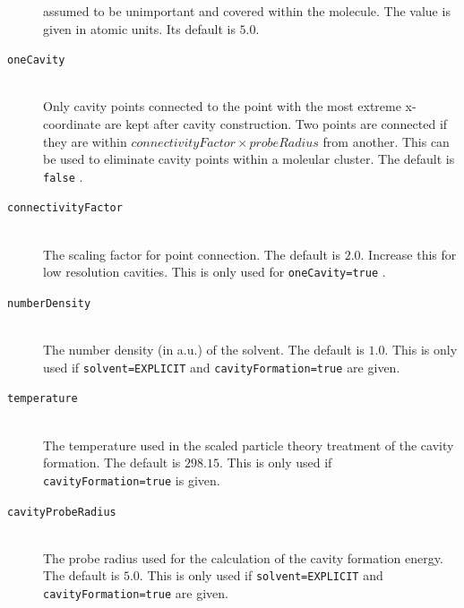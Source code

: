 \documentclass[bibliography=totocnumbered,a4paper,10pt,oneside]{scrbook}
\newcommand{\ttt}[1]{%
  \begingroup\setlength{\fboxsep}{1pt}%
  \colorbox{serenity-green!30}{\texttt{\hspace*{2pt}\vphantom{(g}#1\hspace*{2pt}}}%
  \endgroup
}
\begin{document}
\begin{description}
    assumed to be unimportant and covered within the molecule. The value is given in atomic units. Its default is 
    $5.0$.
    \item [\texttt{oneCavity}]\hfill \\
    Only cavity points connected to the point with the most extreme
    x-coordinate are kept after cavity construction. Two points are connected if they are within
    $connectivityFactor\times probeRadius$ from another. This can be used to eliminate cavity points within a 
    moleular cluster. The default is \ttt{false}.
    \item [\texttt{connectivityFactor}]\hfill \\
    The scaling factor for point connection. The default is $2.0$. Increase this for low
    resolution cavities. This is only used for \ttt{oneCavity=true}.
    \item [\texttt{numberDensity}]\hfill \\
    The number density (in a.u.) of the solvent. The default is $1.0$. This is only used if 
    \ttt{solvent=EXPLICIT} and \ttt{cavityFormation=true} are given.
    \item [\texttt{temperature}]\hfill \\
    The temperature used in the scaled particle theory treatment of the cavity formation. The
    default is $298.15$. This is only used if \ttt{cavityFormation=true} is given.
    \item [\texttt{cavityProbeRadius}]\hfill \\
    The probe radius used for the calculation of the cavity formation energy. The default is $5.0$.
    This is only used if \ttt{solvent=EXPLICIT} and \ttt{cavityFormation=true} are given. 
 \end{description}
\end{document}
